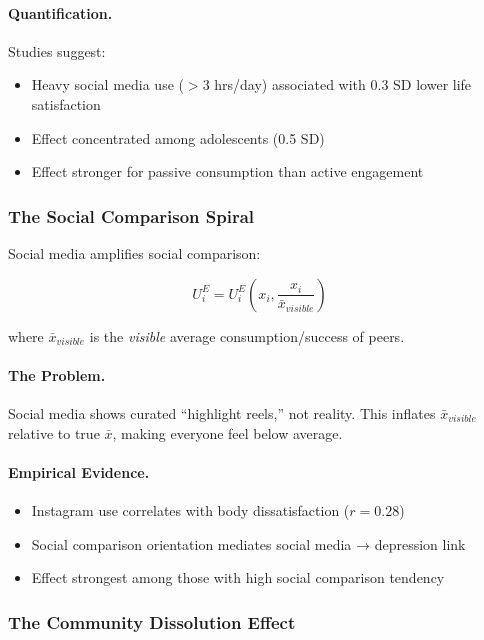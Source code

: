\paragraph{Quantification.}
Studies suggest:
\begin{itemize}
    \item Heavy social media use ($>3$ hrs/day) associated with 0.3 SD lower life satisfaction
    \item Effect concentrated among adolescents (0.5 SD)
    \item Effect stronger for passive consumption than active engagement
\end{itemize}

\subsubsection{The Social Comparison Spiral}

Social media amplifies social comparison:

\begin{equation}
U^E_i = U^E_i\left(x_i, \frac{x_i}{\bar{x}_{visible}}\right)
\end{equation}

where $\bar{x}_{visible}$ is the \emph{visible} average consumption/success of peers.

\paragraph{The Problem.}
Social media shows curated ``highlight reels,'' not reality. This inflates 
$\bar{x}_{visible}$ relative to true $\bar{x}$, making everyone feel 
below average.

\paragraph{Empirical Evidence.}
\begin{itemize}
    \item Instagram use correlates with body dissatisfaction ($r = 0.28$)
    \item Social comparison orientation mediates social media → depression link
    \item Effect strongest among those with high social comparison tendency
\end{itemize}

\subsubsection{The Community Dissolution Effect}

